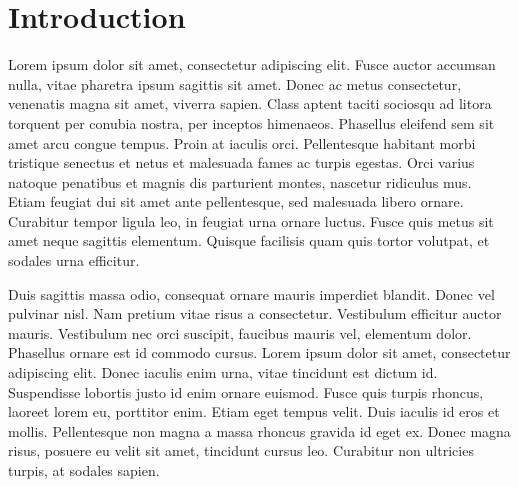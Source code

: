 \section{Introduction}
Lorem ipsum dolor sit amet, consectetur adipiscing elit. Fusce auctor accumsan nulla, vitae pharetra ipsum sagittis sit amet. \cite{Park:2006:DSI, notes2002} Donec ac metus consectetur, venenatis magna sit amet, viverra sapien. Class aptent taciti sociosqu ad litora torquent per conubia nostra, per inceptos himenaeos. Phasellus eleifend sem sit amet arcu congue tempus. Proin at iaculis orci. Pellentesque habitant morbi tristique senectus et netus et malesuada fames ac turpis egestas. Orci varius natoque penatibus et magnis dis parturient montes, nascetur ridiculus mus. \cite{Pellacini:2005:LAH} Etiam feugiat dui sit amet ante pellentesque, sed malesuada libero ornare. Curabitur tempor ligula leo, in feugiat urna ornare luctus. Fusce quis metus sit amet neque sagittis elementum. Quisque facilisis quam quis tortor volutpat, et sodales urna efficitur.



Duis sagittis massa odio, consequat ornare mauris imperdiet blandit. \cite{levoy:2000:TDM} Donec vel pulvinar nisl. Nam pretium vitae risus a consectetur. \cite{sako:2001:SSB, fedkiw:2001:VSO, Jobs95} Vestibulum efficitur auctor mauris. Vestibulum nec orci suscipit, faucibus mauris vel, elementum dolor. Phasellus ornare est id commodo cursus. Lorem ipsum dolor sit amet, consectetur adipiscing elit. Donec iaculis enim urna, vitae tincidunt est dictum id. Suspendisse lobortis justo id enim ornare euismod. Fusce quis turpis rhoncus, laoreet lorem eu, porttitor enim. \cite{kartch:2000:ERA, yee:2000:SSA, parke:1996:CFA} Etiam eget tempus velit. Duis iaculis id eros et mollis. Pellentesque non magna a massa rhoncus gravida id eget ex. Donec magna risus, posuere eu velit sit amet, tincidunt cursus leo. Curabitur non ultricies turpis, at sodales sapien.